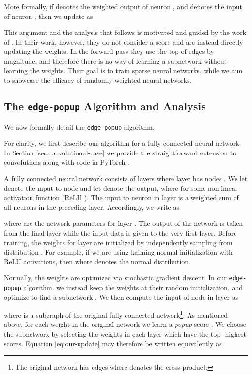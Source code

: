 \documentclass[10pt,twocolumn,letterpaper]{article}
\newcommand{\alg}{\texttt{edge-popup} }
\begin{document}
More formally, if  denotes the weighted output of neuron , and  denotes the input of neuron , then we update  as 


This argument and the analysis that follows is motivated and guided by the work of \cite{dnw}. In their work, however, they do not consider a score and are instead directly updating the weights. In the forward pass they use the top  of edges by magnitude, and therefore there is no way of learning a subnetwork without learning the weights. Their goal is to train sparse neural networks, while we aim to showcase the efficacy of randomly weighted neural networks.

\subsection{The \alg Algorithm and Analysis} \label{sec:alg}

We now formally detail the \alg algorithm. 

For clarity, we first describe our algorithm for a fully connected neural network. In Section \ref{sec:convolutional-case} we provide the straightforward extension to convolutions along with code in PyTorch \cite{pytorch}.

A fully connected neural network consists of layers  where layer  has  nodes . We let  denote the input to node  and let  denote the output, where  for some non-linear activation function  (\eg ReLU \cite{alexnet}). The input to neuron  in layer  is a weighted sum of all neurons in the preceding layer. Accordingly, we write  as

where  are the network parameters for layer . The output of the network is taken from the final layer while the input data is given to the very first layer. Before training, the weights  for layer  are initialized by independently sampling from distribution . For example, if we are using kaiming normal initialization \cite{kaiming-init} with ReLU activations, then  where  denotes the normal distribution.

Normally, the weights  are optimized via stochastic gradient descent. In our \alg algorithm, we instead keep the weights at their random initialization, and optimize to find a subnetwork . We then compute the input of node  in layer  as 

where  is a subgraph of the original fully connected network\footnote{The original network has edges  where  denotes the cross-product.}.  As mentioned above, for each weight  in the original network we learn a \textit{popup} score . We choose the subnetwork  by selecting the weights in each layer which have the top- highest scores. Equation \ref{eq:our-update} may therefore be written equivalently as 
\end{document}
